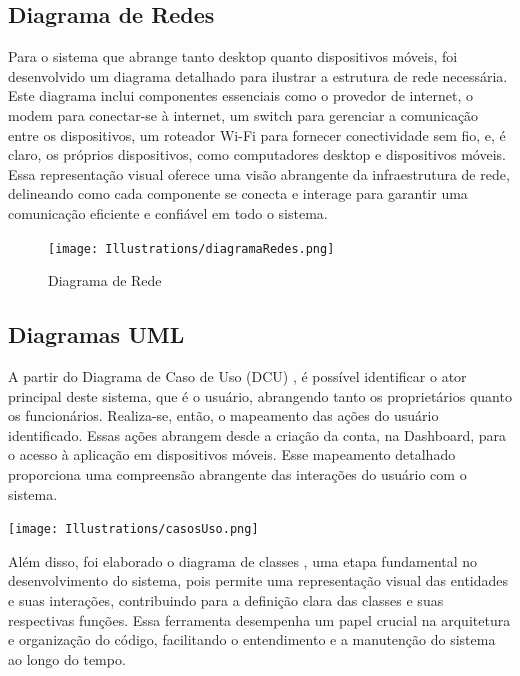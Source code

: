 \subsection*{Diagrama de Redes}

Para o sistema que abrange tanto desktop quanto dispositivos móveis, foi desenvolvido um diagrama  detalhado para ilustrar a estrutura de rede necessária. Este diagrama inclui componentes essenciais como o provedor de internet, o modem para conectar-se à internet, um switch para gerenciar a comunicação entre os dispositivos, um roteador Wi-Fi para fornecer conectividade sem fio, e, é claro, os próprios dispositivos, como computadores desktop e dispositivos móveis. Essa representação visual oferece uma visão abrangente da infraestrutura de rede, delineando como cada componente se conecta e interage para garantir uma comunicação eficiente e confiável em todo o sistema.

\newpage
\begin{figure}[!h]
\centering
\caption{Diagrama de Rede}%
\label{fig:redes}
\texttt{[image: Illustrations/diagramaRedes.png]}
\end{figure}

\subsection*{Diagramas UML}

A partir do Diagrama de Caso de Uso (DCU) , é possível identificar o ator principal deste sistema, que é o usuário, abrangendo tanto os proprietários quanto os funcionários. Realiza-se, então, o mapeamento das ações do usuário identificado. Essas ações abrangem desde a criação da conta, na Dashboard, para o acesso à aplicação em dispositivos móveis. Esse mapeamento detalhado proporciona uma compreensão abrangente das interações do usuário com o sistema.


\begin{flowchart}[!htb]
\centering
\caption{Diagrama Casos de Uso}%
\label{fcht:casodeuso}
\texttt{[image: Illustrations/casosUso.png]}
\end{flowchart}
\newpage

Além disso, foi elaborado o diagrama de classes , uma etapa fundamental no desenvolvimento do sistema, pois permite uma representação visual das entidades e suas interações, contribuindo para a definição clara das classes e suas respectivas funções. Essa ferramenta desempenha um papel crucial na arquitetura e organização do código, facilitando o entendimento e a manutenção do sistema ao longo do tempo.

